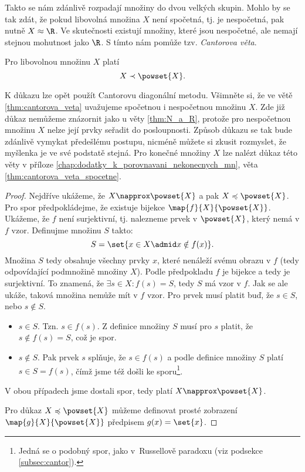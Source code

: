 Takto se nám zdánlivě rozpadají množiny do dvou velkých skupin. Mohlo by se tak zdát, že pokud libovolná množina $X$ není spočetná, tj. je nespočetná, pak nutně $X\approx\R$. Ve skutečnosti existují množiny, které jsou nespočetné, ale nemají stejnou mohutnost jako $\R$. S tímto nám pomůže tzv. \emph{Cantorova věta}.
\begin{theorem}[Cantorova]\label{thm:cantorova_veta}
    Pro libovolnou množinu $X$ platí
    \begin{equation*}
        X\prec\powset{X}.
    \end{equation*}
\end{theorem}
K důkazu lze opět použít Cantorovu diagonální metodu. Všimněte si, že ve větě \ref{thm:cantorova_veta} uvažujeme spočetnou i nespočetnou množinu $X$. Zde již důkaz nemůžeme znázornit jako u věty \ref{thm:N_a_R}, protože pro nespočetnou množinu $X$ nelze její prvky seřadit do posloupnosti. Způsob důkazu se tak bude zdánlivě vymykat předešlému postupu, nicméně můžete si zkusit rozmyslet, že myšlenka je ve své podstatě stejná. Pro konečné množiny $X$ lze nalézt důkaz této věty v příloze \ref{chap:dodatky_k_porovnavani_nekonecnych_mn}, věta \ref{thm:cantorova_veta_spocetne}.
\begin{proof}
    Nejdříve ukážeme, že $X\napprox\powset{X}$ a pak $X\preccurlyeq\powset{X}$. Pro spor předpokládejme, že existuje bijekce $\map{f}{X}{\powset{X}}$. Ukážeme, že $f$ není surjektivní, tj. nalezneme prvek v $\powset{X}$, který nemá v $f$ vzor. Definujme množinu $S$ takto:
    \begin{equation*}
        S=\set{x\in X \admid x\notin f(x)}.
    \end{equation*}
    Množina $S$ tedy obsahuje všechny prvky $x$, které nenáleží svému obrazu v $f$ (tedy odpovídající podmnožině množiny $X$). Podle předpokladu $f$ je bijekce a tedy je surjektivní. To znamená, že $\exists s\in X: f(s)=S$, tedy $S$ má vzor v $f$. Jak se ale ukáže, taková množina nemůže mít v $f$ vzor. Pro prvek musí platit buď, že $s\in S$, nebo $s\notin S$.
    \begin{itemize}
        \item $s\in S$. Tzn. $s\in f(s)$. Z definice množiny $S$ musí pro $s$ platit, že $s\notin f(s)=S$, což je spor.
        \item $s\notin S$. Pak prvek $s$ splňuje, že $s\in f(s)$ a podle definice množiny $S$ platí $s\in S=f(s)$, čímž jsme též došli ke sporu\footnote{Jedná se o podobný spor, jako v~Russellově paradoxu (viz podsekce \ref{subsec:cantor}).}.
    \end{itemize}
    V obou případech jsme dostali spor, tedy platí $X\napprox\powset{X}$.\par
    Pro důkaz $X\preccurlyeq\powset{X}$ můžeme definovat prosté zobrazení $\map{g}{X}{\powset{X}}$ předpisem $g(x)=\set{x}$.
\end{proof}
